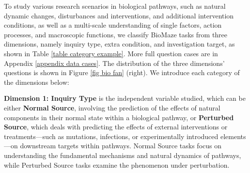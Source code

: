 
To study various research scenarios in biological pathways, such as natural dynamic changes, disturbances and interventions, and additional intervention conditions, as well as a multi-scale understanding of single factors, action processes, and macroscopic functions, we classify BioMaze tasks from three dimensions, namely inquiry type, extra condition, and investigation target, as shown in Table \ref{table category example}. More full question cases are in Appendix \ref{appendix data cases}. The distribution of the three dimensions' questions is shown in Figure \ref{fig bio fan} (right). We introduce each category of the dimensions below:

\begin{figure*}[!t]
    \centering    
    \renewcommand{\thesubfigure}{} %
    \vspace{-2mm}
    \caption{Dataset biological domain and reasoning type distribution. Left: \benchname covers six main domains: metabolism, genetic information processing, environmental information processing, cellular processes, organismal systems, and human diseases. Right: \benchname is categorized along three dimensions of reasoning types: inquiry type, extra condition, and investigation target.}
    \label{fig bio fan}
    \vspace{-2mm}
\end{figure*}



\textbf{Dimension 1: Inquiry Type} is the independent variable studied, which can be either \textbf{Normal Source}, involving the prediction of the effects of natural components in their normal state within a biological pathway, or \textbf{Perturbed Source}, which deals with predicting the effects of external interventions or treatments—such as mutations, infections, or experimentally introduced elements—on downstream targets within pathways. Normal Source tasks focus on understanding the fundamental mechanisms and natural dynamics of pathways, while Perturbed Source tasks examine the phenomenon under perturbation.

